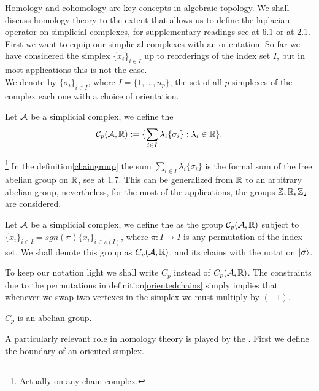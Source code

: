 \documentclass[../1.tex]{subfiles}
\begin{document}
    Homology and cohomology are key concepts in algebraic topology. We shall discuss homology theory to the extent
    that allows us to define the laplacian operator on simplicial complexes, for supplementary readings see \cite{singerthorpe} at 6.1 or \cite{hatcher} at 2.1.
    First we want to equip our simplicial complexes with an orientation. So far we have considered the simplex $\{x_i\}_{i \in I}$ up to reorderings of the index set $I$, but in most applications this is not the case.\\
   
    We denote by $\{\sigma_i\}_{i \in I}$, where $I = \{1,...,n_p\}$, the set of all $p$-simplexes of the complex each one with a choice
    of orientation.

    \begin{defn}
        \label{chaingroup}
        Let $\mathcal{A}$ be a simplicial complex, we define the  
        \[ \mathcal{C}_p(\mathcal{A},\mathbb{R}) := \{ \sum_{i \in I} \lambda_i \{\sigma_i\} : \lambda_i \in \mathbb{R} \}.\]
    \end{defn}
    \footnote{Actually on any chain complex.}
    In the definition\autoref{chaingroup} the sum $\sum_{i \in I} \lambda_i \{\sigma_i\}$ is the formal sum of the free abelian group on $\mathbb{R}$, see \cite{lang} at 1.7.
    This can be generalized from $\mathbb{R}$ to an arbitrary abelian group, nevertheless, for the most of the applications, the groups $\mathbb{Z},\mathbb{R},\mathbb{Z}_2$ are considered. 

    \begin{defn}
        \label{orientedchains}
        Let $\mathcal{A}$ be a simplicial complex, we define the  as
        the group $\mathcal{C}_p(\mathcal{A},\mathbb{R})$ subject to $ \{x_i\}_{i \in I} = sgn(\pi)\{x_i\}_{i \in \pi(I)}$, where $\pi:I \to I$ is 
        any permutation of the index set. We shall denote this group as $C_p(\mathcal{A},\mathbb{R})$, and its chains with the notation $| \sigma \rangle$.
    \end{defn}

    To keep our notation light we shall write $C_p$ instead of $C_p(\mathcal{A},\mathbb{R})$. The constraints due to the 
    permutations in definition\autoref{orientedchains} simply implies that whenever we swap two vertexes in the simplex
    we must multiply by $(-1)$. 
    
    \begin{prop}
        $C_p$ is an abelian group.
    \end{prop}

    A particularly relevant role in homology theory is played by the . First we define the boundary of an oriented simplex.
\end{document}
